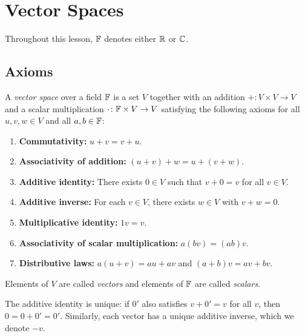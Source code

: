 \documentclass[11pt,a4paper]{article}
\begin{document}
\section{Vector Spaces}
\label{sec:vector_spaces}

Throughout this lesson, $\mathbb{F}$ denotes either $\mathbb{R}$ or $\mathbb{C}$.

\subsection{Axioms}

\begin{definition}
\label{def:vector_space}
A \emph{vector space} over a field $\mathbb{F}$ is a set $V$ together with an addition
$+\colon V \times V \to V$ and a scalar multiplication $\cdot\colon \mathbb{F} \times V \to V$
satisfying the following axioms for all $u, v, w \in V$ and all $a, b \in \mathbb{F}$:
\begin{enumerate}[nosep]
  \item \textbf{Commutativity:} $u + v = v + u$.
  \item \textbf{Associativity of addition:} $(u + v) + w = u + (v + w)$.
  \item \textbf{Additive identity:} There exists $0 \in V$ such that $v + 0 = v$
        for all $v \in V$.
  \item \textbf{Additive inverse:} For each $v \in V$, there exists $w \in V$
        with $v + w = 0$.
  \item \textbf{Multiplicative identity:} $1v = v$.
  \item \textbf{Associativity of scalar multiplication:} $a(bv) = (ab)v$.
  \item \textbf{Distributive laws:} $a(u + v) = au + av$ and $(a + b)v = av + bv$.
\end{enumerate}
Elements of $V$ are called \emph{vectors} and elements of $\mathbb{F}$ are called \emph{scalars}.
\end{definition}

\begin{remark}
\label{rem:uniqueness_zero}
The additive identity is unique: if $0'$ also satisfies $v + 0' = v$ for all $v$,
then $0 = 0 + 0' = 0'$.  Similarly, each vector has a unique additive inverse,
which we denote $-v$.
\end{remark}
\end{document}
